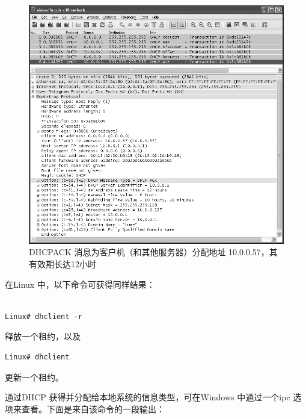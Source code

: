 \begin{figure}
    \centering
    \includegraphics[scale=0.6]{imgs/6/6-9.png}
    \caption{DHCPACK 消息为客户机（和其他服务器）分配地址 10.0.0.57，其有效期长达12小时}
\end{figure}

在Linux 中，以下命令可获得同样结果：

\begin{verbatim}
    
Linux# dhclient -r
\end{verbatim}

释放一个租约，以及
\begin{verbatim}
Linux# dhclient
\end{verbatim}

更新一个租约。

通过DHCP 获得并分配给本地系统的信息类型，可在Windows 中通过一个ipc
选项来查看。下面是来自该命令的一段输出：

